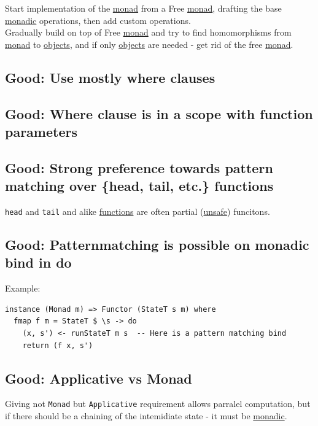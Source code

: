 \documentclass[11pt]{article}
\begin{document}
Start implementation of the \hyperref[org86a5d95]{monad} from a Free \hyperref[org86a5d95]{monad}, drafting the base \hyperref[orgad51197]{monadic} operations, then add custom operations.\\

Gradually build on top of Free \hyperref[org86a5d95]{monad} and try to find homomorphisms from \hyperref[org86a5d95]{monad} to \hyperref[org363acc2]{objects}, and if only \hyperref[org363acc2]{objects} are needed - get rid of the free \hyperref[org86a5d95]{monad}.\\

\subsection{\label{orgf512ab1}Good: Use mostly where clauses}
\label{sec:org560f13d}

\subsection{\label{orga0f9d4f}Good: Where clause is in a scope with function parameters}
\label{sec:org7c6b2a4}

\subsection{\label{org5457e6a}Good: Strong preference towards pattern matching over \{head, tail, etc.\} functions}
\label{sec:org8f20dea}
\texttt{head} and \texttt{tail} and alike \hyperref[orgaa8fb87]{functions} are often partial (\hyperref[org8ae67d0]{unsafe}) funcitons.\\

\subsection{\label{orgfe51770}Good: Patternmatching is possible on monadic bind in do}
\label{sec:orgfa51783}
Example:\\
\begin{verbatim}
instance (Monad m) => Functor (StateT s m) where
  fmap f m = StateT $ \s -> do
    (x, s') <- runStateT m s  -- Here is a pattern matching bind
    return (f x, s')
\end{verbatim}
\subsection{\label{org2d18520}Good: Applicative vs Monad}
\label{sec:orgea6ad40}
Giving not \texttt{Monad} but \texttt{Applicative} requirement allows parralel computation, but if there should be a chaining of the intemidiate state - it must be \hyperref[orgad51197]{monadic}.\\
\end{document}
